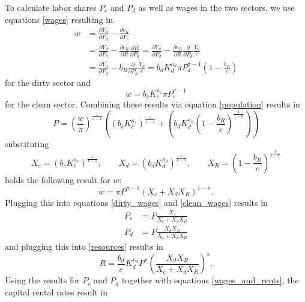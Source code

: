To calculate labor shares $P_c$ and $P_d$ as well as wages in the two sectors, we use equations \eqref{wages} resulting in
\begin{align}
	w &= \frac{\partial Y_d}{\partial P_d} - \frac{\partial c_R}{\partial P_c} \nonumber \\
	&= \frac{\partial Y_d}{\partial P_d} - \frac{\partial c_R}{\partial R} \frac{\partial R}{\partial P_d} \nonumber = \frac{\partial Y_d}{\partial P_d} - \frac{\partial c_R}{\partial R} \frac{\partial}{\partial P_d} \frac{Y_d}{e} \nonumber \\
	&= \frac{\partial Y_d}{\partial P_d} - b_R \frac{\partial}{\partial P_d} \frac{Y_d}{e} = b_d K_d^{\kappa_d} \pi P_d^{\pi-1}\left( 1-\frac{b_R}{e} \right)
	\label{dirty_wages}
\end{align}
for the dirty sector and
\begin{equation}
	w = b_c K_c^{\kappa_c} \pi P_c^{\pi-1}
	\label{clean_wages}
\end{equation}
for the clean sector. Combining these results via equation \eqref{population} results in
\begin{equation}
	P = \left( \frac{w}{\pi} \right)^{\frac{1}{\pi-1}}\left( \left( b_c K_c^{\kappa_c} \right)^{\frac{1}{1-\pi}} + \left( b_d K_d^{\kappa_d} \left( 1 - \frac{b_R}{e} \right)^{\frac{1}{1-\pi}} \right) \right)
\end{equation}
substituting 
\begin{equation}
	X_c = (b_c K_c^{\kappa_c})^{\frac{1}{1-\pi}}, \qquad X_d = (b_d K_d^{\kappa_d})^{\frac{1}{1-\pi}}, \qquad X_R = \left( 1 - \frac{b_R}{e} \right)^{\frac{1}{1-\pi}}
	\label{substitutions}
\end{equation}
holds the following result for $w$:
\begin{equation}
	w = \pi P^{\pi-1}\left( X_c + X_d X_R \right)^{1-\pi}.
	\label{wage_result}
\end{equation}
Plugging this into equations \eqref{dirty_wages} and \eqref{clean_wages} results in 
\begin{align}
	P_c &= P \frac{X_c}{X_c + X_d X_R} \label{clean_labor} \\
	P_d &= P \frac{X_d X_R}{X_c + X_d X_R} \label{dirty_labor}
\end{align}
and plugging this into \eqref{resources} results in
\begin{equation}
	R = \frac{b_d}{e}K_d^{\kappa_d}P^{\pi}\left( \frac{X_d X_R}{X_c + X_d X_R} \right)^{\pi}.
	\label{R_result}
\end{equation}
Using the results for $P_c$ and $P_d$ together with equations \eqref{wages_and_rents}, the capital rental rates result in
